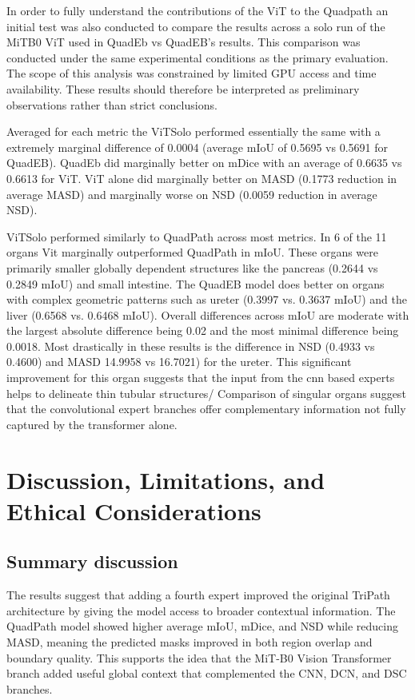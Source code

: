 \documentclass[twocolumn]{article}
\begin{document}
In order to fully understand the contributions of the ViT to the Quadpath an initial test was also conducted to compare the results across a solo run of the MiTB0 ViT used in QuadEb vs QuadEB’s results. This comparison was conducted under the same experimental conditions as the primary evaluation. The scope of this analysis was constrained by limited GPU access and time availability. These results should therefore be interpreted as preliminary observations rather than strict conclusions. 

Averaged for each metric the ViTSolo performed essentially the same with a extremely marginal difference of 0.0004 (average mIoU of 0.5695 vs 0.5691 for QuadEB). QuadEb did marginally better on mDice with an average of 0.6635 vs 0.6613 for ViT. ViT alone did marginally better on MASD (0.1773 reduction in average MASD) and marginally worse on NSD (0.0059 reduction in average NSD). 

ViTSolo performed similarly to QuadPath across most metrics. In 6 of the 11 organs Vit marginally outperformed QuadPath in mIoU. These organs were primarily smaller globally dependent structures like the pancreas (0.2644 vs 0.2849 mIoU)  and small intestine. The QuadEB model does better on organs with complex geometric patterns such as ureter (0.3997 vs. 0.3637 mIoU)  and the liver (0.6568 vs. 0.6468 mIoU). Overall differences across mIoU are moderate with the largest absolute difference being 0.02 and the most minimal difference being 0.0018. Most drastically in these results is the difference in NSD (0.4933 vs 0.4600) and MASD 14.9958 vs 16.7021) for the ureter. This significant improvement for this organ suggests that the input from the cnn based experts helps to delineate thin tubular structures/  Comparison of singular organs suggest that the convolutional expert branches offer complementary information not fully captured by the transformer alone.

\section{Discussion, Limitations, and Ethical Considerations}

\subsection{Summary discussion}
The results suggest that adding a fourth expert improved the original TriPath architecture by giving the model access to broader contextual information. The QuadPath model showed higher average mIoU, mDice, and NSD while reducing MASD, meaning the predicted masks improved in both region overlap and boundary quality. This supports the idea that the MiT-B0 Vision  Transformer branch added useful global context that complemented the CNN, DCN, and DSC branches.
\end{document}
